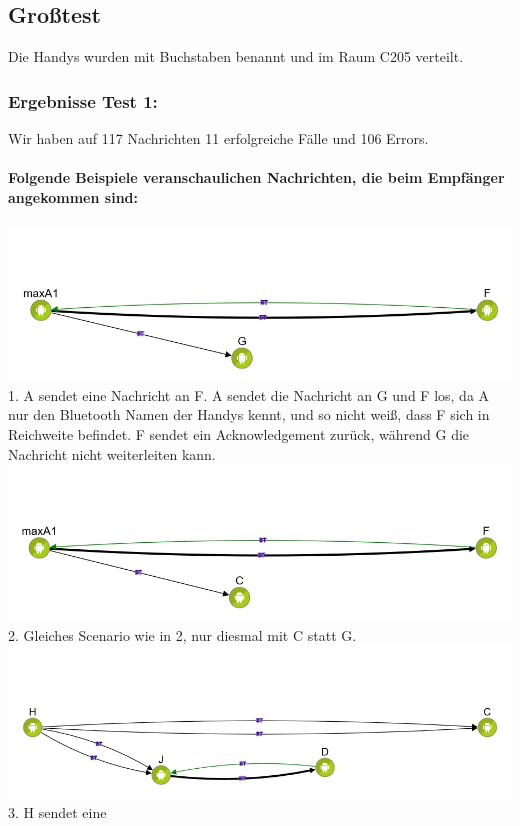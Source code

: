 \subsection{Großtest}\label{großtest-1}

Die Handys wurden mit Buchstaben benannt und im Raum C205 verteilt.

\subsubsection{Ergebnisse Test 1:}\label{ergebnisse-test-1}

Wir haben auf 117 Nachrichten 11 erfolgreiche Fälle und 106 Errors.
\\\\
\textbf{Folgende Beispiele veranschaulichen Nachrichten, die beim
Empfänger angekommen sind:}
\\\\
\includegraphics[width=1.0\textwidth]{belege/grosstests/Bilder/Erfolg4.jpg}\\
1. A sendet eine Nachricht an F. A sendet die Nachricht an G und F los, da A nur den
Bluetooth Namen der Handys kennt, und so nicht weiß, dass F sich in
Reichweite befindet. F sendet ein Acknowledgement zurück, während G die
Nachricht nicht weiterleiten kann.\\
\includegraphics[width=1.0\textwidth]{belege/grosstests/Bilder/Erfolg3.jpg}\\
2. Gleiches Scenario wie in 2, nur diesmal mit C statt G.\\
\includegraphics[width=1.0\textwidth]{belege/grosstests/Bilder/Erfolg2.jpg}\\ 3. H sendet eine
